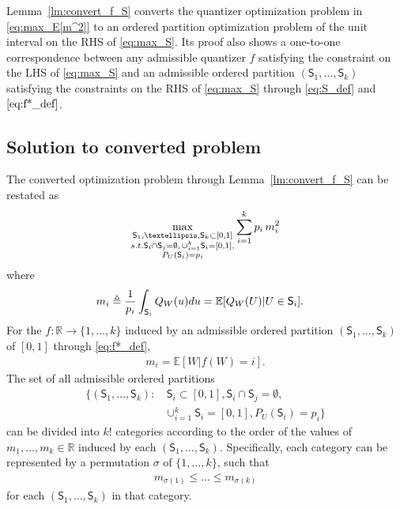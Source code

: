 \documentclass[10pt,a4paper]{amsart}
\newcommand{\R}{\mathbb{R}}
\newcommand{\E}{\mathbb{E}}
\def\sS{{\mathsf S}}
\def\rd{{\rm d}}
\def\deq{\triangleq}
\begin{document}
Lemma~\ref{lm:convert_f_S} converts the quantizer optimization problem in \eqref{eq:max_E[m^2]}
to an ordered partition optimization problem of the unit interval on the RHS of \eqref{eq:max_S}.
Its proof also shows a one-to-one correspondence between any admissible quantizer $f$ satisfying the constraint on the LHS of \eqref{eq:max_S} and an admissible ordered partition $(\sS_1,\ldots,\sS_k)$ satisfying the constraints on the RHS of \eqref{eq:max_S} through \eqref{eq:S_def} and $\eqref{eq:f*_def}$.

\subsection{Solution to converted problem}
The converted optimization problem through Lemma~\ref{lm:convert_f_S} can be restated as
\begin{align}
\max_{\substack{\sS_1,\ldots,\sS_k\subset[0,1] 
\\
\textnormal{s.t. } \sS_i\cap \sS_j = \emptyset, \, \cup_{i=1}^k \sS_i = [0,1], \\
P_U(\sS_i)=p_i}}
\sum_{i=1}^k p_i \, m_i^2 \label{eq:converted_max_Em^2}
\end{align}
where
\begin{align}
    m_i &\deq \frac{1}{p_i}\int_{\sS_i}Q_W(u) \rd u 
    = \E[Q_W(U)|U\in\sS_i].
\end{align}
For the $f:\R\rightarrow\{1,\ldots,k\}$ induced by an admissible ordered partition $(\sS_1,\ldots,\sS_k)$ of $[0,1]$ through \eqref{eq:f*_def}, 
\begin{align}
    m_i = \E[W|f(W)=i] .
\end{align}
The set of all admissible ordered partitions 
\begin{align}
\{(\sS_1,\ldots,\sS_k): 
& \, \sS_i\subset [0,1],  \sS_i\cap \sS_j = \emptyset,  \nonumber \\
&  \cup_{i=1}^k \sS_i = [0,1], P_U(\sS_i)=p_i\} \label{eq:def_set_ord_part}
\end{align}
can be divided into $k!$ categories according to the order of the values of $m_1, \ldots, m_k \in \R$ induced by each $(\sS_1,\ldots,\sS_k)$.
Specifically, each category can be represented by a permutation $\sigma$ of $\{1,\ldots,k\}$, such that 
\begin{align}
    m_{\sigma(1)} \le \ldots \le m_{\sigma(k)} \label{eq:order_m}
\end{align}
for each $(\sS_1,\ldots,\sS_k)$ in that category.
\end{document}

